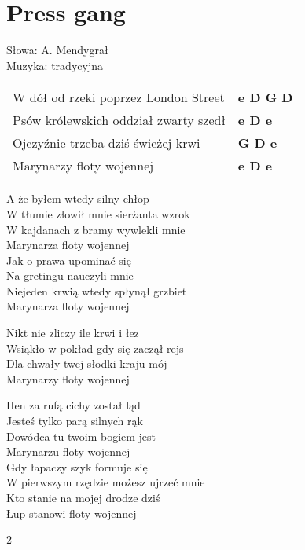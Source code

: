 \section{Press gang}
Słowa: A. Mendygrał\\
Muzyka: tradycyjna

\vspace{1em}
\begin{tabular}{@{}p{10cm}@{}l@{}}
W dół od rzeki poprzez London Street & \bfseries e D G D\\
Psów królewskich oddział zwarty szedł & \bfseries e D e\\
Ojczyźnie trzeba dziś świeżej krwi & \bfseries G D e\\
Marynarzy floty wojennej & \bfseries e D e\\
\end{tabular}

\vspace{1em}
A że byłem wtedy silny chłop \\
W tłumie złowił mnie sierżanta wzrok \\
W kajdanach z bramy wywlekli mnie \\
Marynarza floty wojennej \\


Jak o prawa upominać się \\
Na gretingu nauczyli mnie \\
Niejeden krwią wtedy spłynął grzbiet \\
Marynarza floty wojennej \\

\begin{multicols}{2}
Nikt nie zliczy ile krwi i łez \\
Wsiąkło w pokład gdy się zaczął rejs \\
Dla chwały twej słodki kraju mój \\
Marynarzy floty wojennej \\
\columnbreak

Hen za rufą cichy został ląd \\
Jesteś tylko parą silnych rąk \\
Dowódca tu twoim bogiem jest \\
Marynarzu floty wojennej \\


Gdy łapaczy szyk formuje się \\
W pierwszym rzędzie możesz ujrzeć mnie \\
Kto stanie na mojej drodze dziś \\
Łup stanowi floty wojennej
\end{multicols}{2}